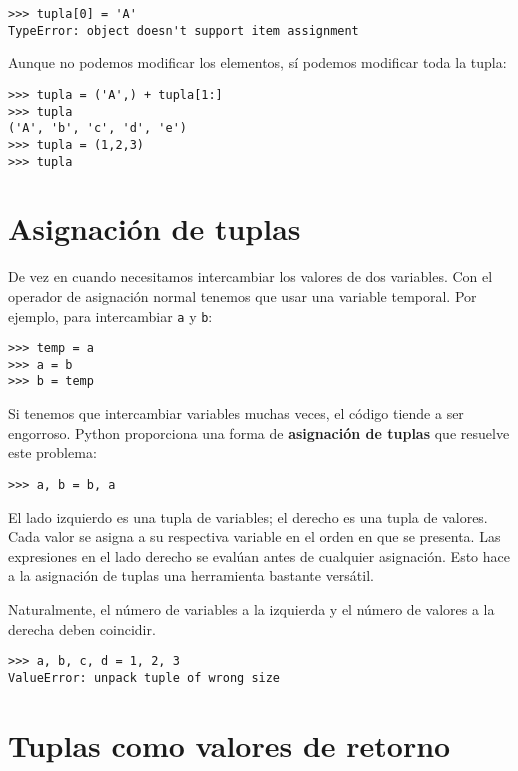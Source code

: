 \begin{lstlisting}
>>> tupla[0] = 'A'
TypeError: object doesn't support item assignment
\end{lstlisting}
Aunque no podemos modificar los elementos, sí podemos modificar toda
la tupla:
\begin{lstlisting}
>>> tupla = ('A',) + tupla[1:]
>>> tupla
('A', 'b', 'c', 'd', 'e')
>>> tupla = (1,2,3)
>>> tupla
\end{lstlisting}
\section{Asignación de tuplas}

\label{tuple assignment}  

De vez en cuando necesitamos intercambiar los valores de dos variables.
Con el operador de asignación normal tenemos que usar una variable
temporal. Por ejemplo, para intercambiar \texttt{a} y \texttt{b}:
\begin{lstlisting}
>>> temp = a
>>> a = b
>>> b = temp
\end{lstlisting}
Si tenemos que intercambiar variables muchas veces, el código tiende
a ser engorroso. Python proporciona una forma de \textbf{asignación
de tuplas} que resuelve este problema:
\begin{lstlisting}
>>> a, b = b, a
\end{lstlisting}
El lado izquierdo es una tupla de variables; el derecho es una tupla
de valores. Cada valor se asigna a su respectiva variable en el orden
en que se presenta. Las expresiones en el lado derecho se evalúan
antes de cualquier asignación. Esto hace a la asignación de tuplas
una herramienta bastante versátil.

Naturalmente, el número de variables a la izquierda y el número de
valores a la derecha deben coincidir.
\begin{lstlisting}
>>> a, b, c, d = 1, 2, 3
ValueError: unpack tuple of wrong size
\end{lstlisting}
\section{Tuplas como valores de retorno}

